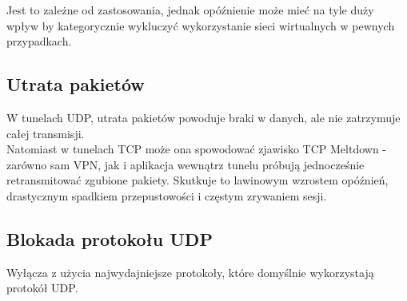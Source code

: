 Jest to zależne od zastosowania, jednak opóźnienie może mieć na tyle duży wpływ by kategorycznie wykluczyć wykorzystanie sieci wirtualnych w pewnych przypadkach.

\subsection{Utrata pakietów}
W tunelach UDP, utrata pakietów powoduje braki w danych, ale nie zatrzymuje całej transmisji.\\

Natomiast w tunelach TCP może ona spowodować zjawisko TCP Meltdown - zarówno sam VPN, jak i aplikacja wewnątrz tunelu próbują jednocześnie retransmitować zgubione pakiety. Skutkuje to lawinowym wzrostem opóźnień, drastycznym spadkiem przepustowości i częstym zrywaniem sesji.

\subsection{Blokada protokołu UDP}
Wyłącza z użycia najwydajniejsze protokoły, które domyślnie wykorzystają protokół UDP.